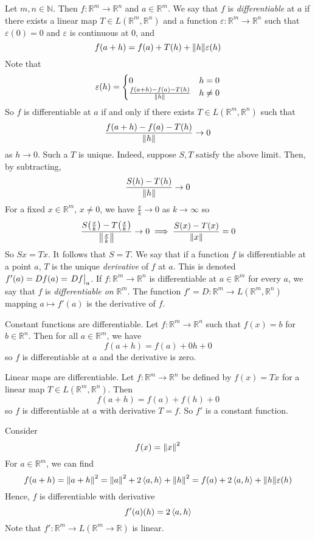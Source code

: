 \begin{definition}
	Let \( m, n \in \mathbb N \).
	Then \( f \colon \mathbb R^m \to \mathbb R^n \) and \( a \in \mathbb R^m \).
	We say that \( f \) is \textit{differentiable} at \( a \) if there exists a linear map \( T \in L(\mathbb R^m, \mathbb R^n) \) and a function \( \varepsilon \colon \mathbb R^m \to \mathbb R^n \) such that \( \varepsilon(0) = 0 \) and \( \varepsilon \) is continuous at \( 0 \), and
	\[
		f(a+h) = f(a) + T(h) + \norm{h} \varepsilon(h)
	\]
	Note that
	\[
		\varepsilon(h) = \begin{cases}
			0                                     & h = 0    \\
			\frac{f(a+h) - f(a) - T(h)}{\norm{h}} & h \neq 0
		\end{cases}
	\]
	So \( f \) is differentiable at \( a \) if and only if there exists \( T \in L(\mathbb R^m, \mathbb R^n) \) such that
	\[
		\frac{f(a+h) - f(a) - T(h)}{\norm{h}} \to 0
	\]
	as \( h \to 0 \).
	Such a \( T \) is unique.
	Indeed, suppose \( S, T \) satisfy the above limit.
	Then, by subtracting,
	\[
		\frac{S(h) - T(h)}{\norm{h}} \to 0
	\]
	For a fixed \( x \in \mathbb R^m \), \( x \neq 0 \), we have \( \frac{x}{k} \to 0 \) as \( k \to \infty \) so
	\[
		\frac{S\qty(\frac{x}{k}) - T\qty(\frac{x}{k})}{\norm{\frac{x}{k}}} \to 0 \implies \frac{S(x) - T(x)}{\norm{x}} = 0
	\]
	So \( Sx = Tx \).
	It follows that \( S = T \).
	We say that if a function \( f \) is differentiable at a point \( a \), \( T \) is the unique \textit{derivative} of \( f \) at \( a \).
	This is denoted \( f'(a) = Df(a) = \eval{Df}_a \).
	If \( f \colon \mathbb R^m \to \mathbb R^n \) is differentiable at \( a \in \mathbb R^m \) for every \( a \), we say that \( f \) is \textit{differentiable on} \( \mathbb R^m \).
	The function \( f' = D \colon \mathbb R^m \to L(\mathbb R^m, \mathbb R^n) \) mapping \( a \mapsto f'(a) \) is the derivative of \( f \).
\end{definition}
\begin{example}
	Constant functions are differentiable.
	Let \( f \colon \mathbb R^m \to \mathbb R^n \) such that \( f(x) = b \) for \( b \in \mathbb R^n \).
	Then for all \( a \in \mathbb R^m \), we have
	\[
		f(a+h) = f(a) + 0h + 0
	\]
	so \( f \) is differentiable at \( a \) and the derivative is zero.
\end{example}
\begin{example}
	Linear maps are differentiable.
	Let \( f \colon \mathbb R^m \to \mathbb R^n \) be defined by \( f(x) = Tx \) for a linear map \( T \in L(\mathbb R^m, \mathbb R^n) \).
	Then
	\[
		f(a+h) = f(a) + f(h) + 0
	\]
	so \( f \) is differentiable at \( a \) with derivative \( T = f \).
	So \( f' \) is a constant function.
\end{example}
\begin{example}
	Consider
	\[
		f(x) = \norm{x}^2
	\]
	For \( a \in \mathbb R^m \), we can find
	\[
		f(a+h) = \norm{a+h}^2 = \norm{a}^2 + 2\left\langle{a,h}\right\rangle + \norm{h}^2 = f(a) + 2\left\langle{a,h}\right\rangle + \norm{h} \varepsilon(h)
	\]
	Hence, \( f \) is differentiable with derivative
	\[
		f'(a)(h) = 2\left\langle{a,h}\right\rangle
	\]
	Note that \( f' \colon \mathbb R^m \to L(\mathbb R^m \to \mathbb R) \) is linear.
\end{example}
